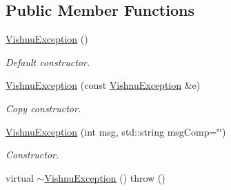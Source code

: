 \subsection*{Public Member Functions}
\begin{DoxyCompactItemize}
\item 
\hypertarget{classVishnuException_af9d3de8d97834f2c3db08af6f99c79f5}{
\hyperlink{classVishnuException_af9d3de8d97834f2c3db08af6f99c79f5}{VishnuException} ()}
\label{classVishnuException_af9d3de8d97834f2c3db08af6f99c79f5}

\begin{DoxyCompactList}\small\item\em Default constructor. \item\end{DoxyCompactList}\item 
\hypertarget{classVishnuException_a85bde2d5558cdf5291ceb83bcacfc635}{
\hyperlink{classVishnuException_a85bde2d5558cdf5291ceb83bcacfc635}{VishnuException} (const \hyperlink{classVishnuException}{VishnuException} \&e)}
\label{classVishnuException_a85bde2d5558cdf5291ceb83bcacfc635}

\begin{DoxyCompactList}\small\item\em Copy constructor. \item\end{DoxyCompactList}\item 
\hypertarget{classVishnuException_a3fa6b721fcf483c6b201f6fb2cb7c52b}{
\hyperlink{classVishnuException_a3fa6b721fcf483c6b201f6fb2cb7c52b}{VishnuException} (int msg, std::string msgComp=\char`\"{}\char`\"{})}
\label{classVishnuException_a3fa6b721fcf483c6b201f6fb2cb7c52b}

\begin{DoxyCompactList}\small\item\em Constructor. \item\end{DoxyCompactList}\item 
\hypertarget{classVishnuException_a97b6892ceda39b5d123e25a4110e9686}{
virtual \hyperlink{classVishnuException_a97b6892ceda39b5d123e25a4110e9686}{$\sim$VishnuException} ()  throw ()}
\label{classVishnuException_a97b6892ceda39b5d123e25a4110e9686}


\end{DoxyCompactItemize}
